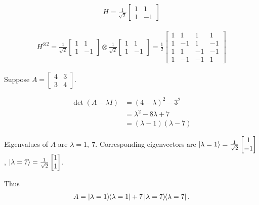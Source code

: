 

\begin{align*}
	H  = \frac{1}{\sqrt{2}} \begin{bmatrix}
		1 & 1 \\
		1 & -1
	\end{bmatrix}
\end{align*}

\begin{align*}
	H^{\otimes 2}
	=
	\frac{1}{\sqrt{2}} \begin{bmatrix}
	1 & 1 \\
	1 & -1
	\end{bmatrix}
	\otimes
	\frac{1}{\sqrt{2}} \begin{bmatrix}
	1 & 1 \\
	1 & -1
	\end{bmatrix}
	=
	\frac{1}{2} \begin{bmatrix}
		1 & 1 & 1 & 1 \\
		1 & -1 & 1 & -1 \\
		1 & 1 & -1 & -1 \\
		1 & -1 & -1 & 1
	\end{bmatrix}
\end{align*}




Suppose $A = \begin{bmatrix}
4 & 3 \\
3 & 4
\end{bmatrix} $.

\begin{align*}
	\det (A - \lambda I ) &= (4-\lambda)^2 - 3^2\\
		&= \lambda^2 -8\lambda + 7\\
		&= (\lambda - 1)(\lambda - 7)
\end{align*}

Eigenvalues of $A$ are $\lambda = 1, ~ 7$.
Corresponding eigenvectors are
$
	\ket{\lambda = 1} = \frac{1}{\sqrt{2}} \begin{bmatrix}
	1 \\
	-1
	\end{bmatrix}
$,
$
	\ket{\lambda = 7} = \frac{1}{\sqrt{2}} \begin{bmatrix}
1 \\
1
\end{bmatrix}
$.

\vspace{5mm}
Thus
\begin{align*}
	A = \ket{\lambda = 1}\hspace{-1mm} \bra{\lambda = 1} + 7 \ket{\lambda = 7}\hspace{-1mm} \bra{\lambda = 7}.
\end{align*}

